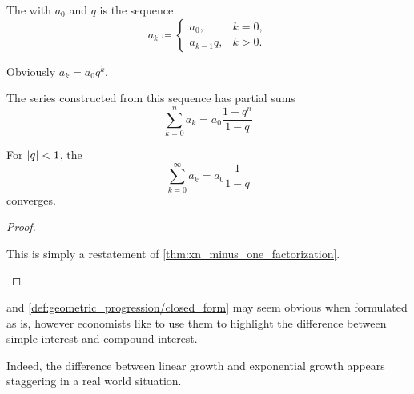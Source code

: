 \begin{definition}\label{def:geometric_progression}
  The  with  \( a_0 \) and  \( q \) is the sequence
  \begin{equation*}
    a_k \coloneqq \begin{cases}
      a_0, &k = 0, \\
      a_{k-1} q, &k > 0.
    \end{cases}
  \end{equation*}

  \begin{defenum}
     Obviously \( a_k = a_0 q^k \).

     The series constructed from this sequence has partial sums
    \begin{equation*}
      \sum_{k=0}^n a_k = a_0 \frac {1 - q^n} {1 - q}
    \end{equation*}

     For \( \left\vert q \right\vert < 1 \), the 
    \begin{equation}\label{thm:geometric_progression/series}
      \sum_{k=0}^\infty a_k = a_0 \frac 1 {1 - q}
    \end{equation}
    converges.
  \end{defenum}
\end{definition}
\begin{proof}
  \begin{description}
     This is simply a restatement of \cref{thm:xn_minus_one_factorization}.
  \end{description}
\end{proof}

\begin{remark}\label{remark:progressions_and_interest}
   and \cref{def:geometric_progression/closed_form} may seem obvious when formulated as is, however economists like to use them to highlight the difference between simple interest and compound interest.

  Indeed, the difference between linear growth and exponential growth appears staggering in a real world situation.
\end{remark}
